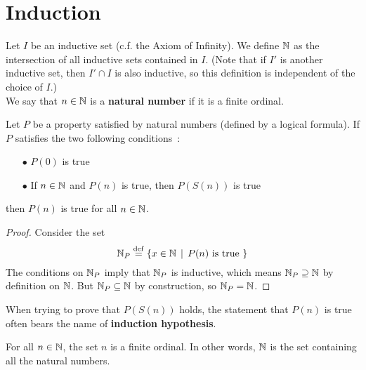 \section{Induction}


\begin{definition} \label{natural-numbers}
    Let $I$ be an inductive set (c.f. the Axiom of Infinity). We define $\operatorname{\mathbb N}$ as the intersection of all inductive sets contained in $I$. (Note that if $I'$ is another inductive set, then $I' \cap I$ is also inductive, so this definition is independent of the choice of $I$.)
    \\

    We say that $n \in \operatorname{\mathbb N}$ is a \textbf{natural number} if it is a finite ordinal.
\end{definition}

\begin{theorem} \label{weak-induction-on-natural-numbers}
    Let $P$ be a property satisfied by natural numbers (defined by a logical formula). If $P$ satisfies the two following conditions~:
    \\

    \begin{itemize}
        \item[$\bullet$] $P(0)$ is true
        \\

        \item[$\bullet$] If $n \in \operatorname{\mathbb N}$ and $P(n)$ is true, then $P(S(n))$ is true
        \\

    \end{itemize}
    then $P(n)$ is true for all $n \in \operatorname{\mathbb N}$.
\end{theorem}

\begin{proof}
    Consider the set
    \[
        \operatorname{\mathbb N}_P \overset{\mathrm{def}}{=} \{ x \in \operatorname{\mathbb N} \, \mid \, P(n) \text{ is true } \}    
    \]
    The conditions on $\operatorname{\mathbb N}_P$ imply that $\operatorname{\mathbb N}_P$ is inductive, which means $\operatorname{\mathbb N}_P \supseteq \operatorname{\mathbb N}$ by definition on $\operatorname{\mathbb N}$. But $\operatorname{\mathbb N}_P \subseteq \operatorname{\mathbb N}$ by construction, so $\operatorname{\mathbb N}_P = \operatorname{\mathbb N}$. 
\end{proof}

\begin{remark}
    When trying to prove that $P(S(n))$ holds, the statement that $P(n)$ is true often bears the name of \textbf{induction hypothesis}.
\end{remark}

\begin{lemma} \label{natural-numbers-are-finite-ordinals}
    For all $n \in \operatorname{\mathbb N}$, the set $n$ is a finite ordinal. In other words, $\operatorname{\mathbb N}$ is the set containing all the natural numbers.
\end{lemma}


